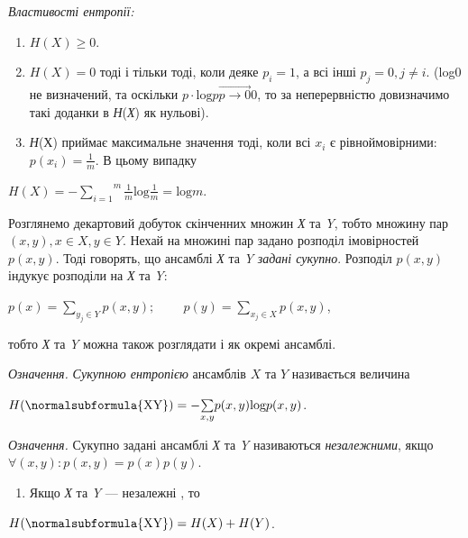 \bigskip

{\itshape
Властивості ентропії:}

\liststyleWWviiiNumxxxix
\begin{enumerate}
\item  ${H(X)\ge 0}$.
\item  ${H(X)=0}$ тоді і тільки тоді, коли деяке  ${p_{{i}}=1}$, а всі інші 
${p_{{j}}=0,j\neq i}$. (log0 не визначений, та оскільки  ${p\cdot
\text{log}p\overrightarrow{{{p\rightarrow 0}}}0}$, то за неперервністю
довизначимо такі доданки в \textit{Н}(\textit{Х}) як нульові).
\item \textit{Н}(Х) приймає максимальне значення тоді, коли всі  ${x_{{i}}}$ є
рівноймовірними:  ${p(x_{{i}})=\frac{1}{m}}$. В цьому випадку
\end{enumerate}
{\centering
 ${H(X)=-\overset{{m}}{\underset{{i=1}}{\sum
}}{\frac{{1}}{{m}}\text{log}\frac{1}{m}}=\text{log}m}$.
\par}


\bigskip

Розглянемо декартовий добуток скінченних множин \textit{Х} та \textit{Y}, тобто
множину пар  ${(x,y),x\in X,y\in Y}$. Нехай на множині пар задано розподіл
імовірностей  ${p(x,y)}$. Тоді говорять, що ансамблі \textit{Х} та \textit{Y}
\textit{задані сукупно}. Розподіл  ${p(x,y)}$ індукує розподіли на \textit{Х}
та \textit{Y}:

{\centering
 ${p(x)=\underset{{y_{{j}}\in Y}}{\sum
}{p(x,y)};\;\;\;\;\;\;\;\;p(y)=\underset{x_{{j}}\in X}{\sum }{p(x,y)}}$,
\par}

тобто \textit{Х} та \textit{Y} можна також розглядати і як окремі ансамблі.

\textit{Означення.} \textit{Сукупною ентропією} ансамблів  ${X}$ та  ${Y}$
називається величина

{\centering
 ${H(\normalsubformula{\text{XY}})=-\underset{{x,y}}{\sum
}{p(x,y)\text{log}p(x,y)}}$.
\par}

\textit{Означення.} Сукупно задані ансамблі \textit{Х} та \textit{Y} називаються
\textit{незалежними}, якщо  ${\forall (x,y):p(x,y)=p(x)p(y)}$.

\liststyleWWviiiNumxxxix
\setcounter{saveenum}{\value{enumi}}
\begin{enumerate}
\setcounter{enumi}{\value{saveenum}}
\item Якщо \textit{Х} та \textit{Y} --- незалежні , то
\end{enumerate}
{\centering
 ${H(\normalsubformula{\text{XY}})=H(X)+H(Y)}$.
\par}

